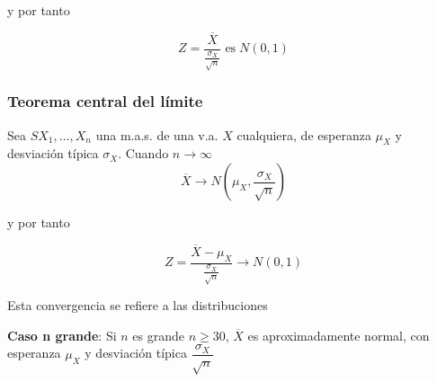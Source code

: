 \documentclass[
]{article}
\begin{document}
y por tanto

\[Z = \dfrac{\overline{X}}{\frac{\sigma_X}{\sqrt{n}}}\; \mbox{es}\; N(0,1)\]

\hypertarget{teorema-central-del-luxedmite}{%
\subsubsection{Teorema central del
límite}\label{teorema-central-del-luxedmite}}

Sea \(SX_1,\ldots,X_n\) una m.a.s. de una v.a. \(X\) cualquiera, de
esperanza \(\mu_X\) y desviación típica \(\sigma_X\). Cuando
\({n\to \infty}\)
\[{\overline{X} \to N\left(\mu_X,\dfrac{\sigma_X}{\sqrt{n}}\right)}\]

y por tanto

\[Z = {\dfrac{\overline{X}-\mu_X}{\frac{\sigma_X}{\sqrt{n}}} \to N(0,1)}\]

Esta convergencia se refiere a las distribuciones

\textbf{Caso n grande}: Si \(n\) es grande \(n\geq 30\),
\(\overline{X}\) es aproximadamente normal, con esperanza \(\mu_X\) y
desviación típica \(\dfrac{\sigma_X}{\sqrt{n}}\)
\end{document}
